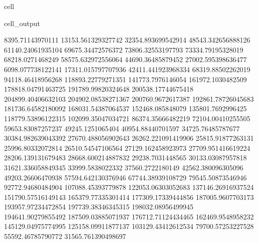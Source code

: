 \documentclass[letterpaper,10pt,english]{jupyterBook}
\begin{document}
\begin{sphinxuseclass}{cell}
\begin{sphinxVerbatimOutput}
\begin{sphinxuseclass}{cell_output}
\begin{sphinxVerbatim}[commandchars=\\\{\}]
8395.71143970111  \PYGZhy{}13153.561329327742  \PYGZhy{}32354.893699542914  \PYGZhy{}48543.342656888126  \PYGZhy{}61140.24061935104  \PYGZhy{}69675.34472576372  \PYGZhy{}73806.32553197793  \PYGZhy{}73334.79195328019  \PYGZhy{}68218.0271468249  \PYGZhy{}58575.632972556064  \PYGZhy{}44690.36485879452  \PYGZhy{}27002.595398636477  \PYGZhy{}6098.077738122141  17311.015797707936  42411.441923968334  68319.88502262019  94118.46418956268  118893.22779271351  141773.7976146054  161972.1030482509  178818.04791463725  191789.99820324648  200538.17744675418  204899.40406632103  204902.08538271367  200760.9672617387  192861.78726045683  181736.64582180092  168031.54387064537  152468.085848079  135801.7692996425  118779.53896122315  102099.35047034721  86374.35666482219  72104.00410255505  59653.83087257237  49245.1251065404  40954.88440701597  34725.76485787677  30384.982639043392  27670.488056902643  26262.221091419906  25815.91877263131  25996.80332072814  26510.54547106564  27129.162458923973  27709.951416619224  28206.139131679483  28668.600214887832  29238.7031448565  30133.03087957818  31621.336058849345  33999.5838022332  37560.2722180149  42562.380096305096  49203.26606470938  57594.642130376946  67744.38939108729  79545.50873546946  92772.94680484904  107088.45393779878  122053.06303052683  137146.26916937524  151790.57516149143  165379.77335301414  177309.17339444856  187005.9607703173  193957.97234472854  197739.38346345315  198032.08956499945  194641.90279855492  187509.03885071937  176712.71124434465  162469.9548958232  145129.04975774995  125158.09911877137  103129.43412612534  79700.57253227528  55592.46785790772  31565.761390498697  

\end{sphinxVerbatim}
\end{sphinxuseclass}
\end{sphinxVerbatimOutput}
\end{sphinxuseclass}
\end{document}
